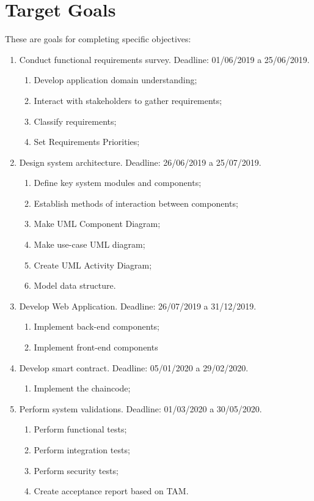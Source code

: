 \section{Target Goals}\label{sec:targetGoals}

These are goals for completing specific objectives:

\begin{enumerate}

\item Conduct functional requirements survey. Deadline: 01/06/2019 a 25/06/2019.
\begin{enumerate}
\item Develop application domain understanding;
\item Interact with stakeholders to gather requirements;
\item Classify requirements;
\item Set Requirements Priorities;
\end{enumerate}
\item Design system architecture. Deadline: 26/06/2019 a 25/07/2019.
\begin{enumerate}
\item Define key system modules and components;
\item Establish methods of interaction between components;
\item Make UML Component Diagram;
\item Make use-case UML diagram;
\item Create UML Activity Diagram;
\item Model data structure.
\end{enumerate}
\item Develop Web Application. Deadline: 26/07/2019 a 31/12/2019.
\begin{enumerate}
\item Implement back-end components;
\item Implement front-end components
\end{enumerate}
\item Develop smart contract. Deadline: 05/01/2020 a 29/02/2020.
\begin{enumerate}
\item Implement the chaincode;
\end{enumerate}
\item Perform system validations. Deadline: 01/03/2020 a 30/05/2020.
\begin{enumerate}
\item Perform functional tests;
\item Perform integration tests;
\item Perform security tests;
\item Create acceptance report based on \acf{TAM}.
\end{enumerate}
\end{enumerate}